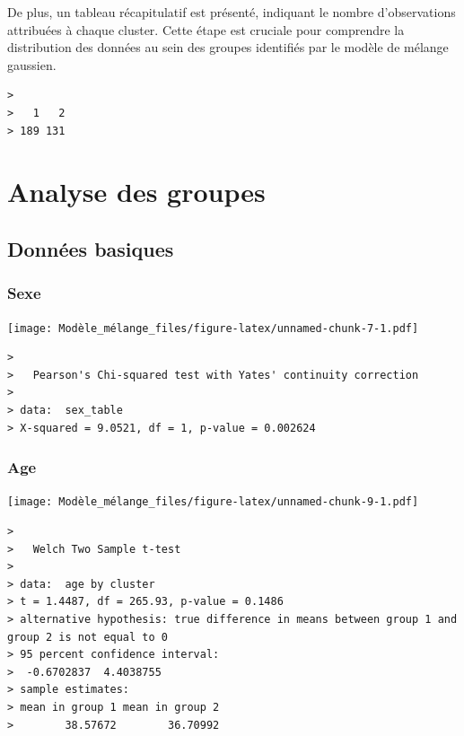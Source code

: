 \documentclass[
]{article}
\let\origfigure\figure
\let\endorigfigure\endfigure
\renewenvironment{figure}[1][2]{
    \expandafter\origfigure\expandafter[H]
} {
    \endorigfigure
}
\begin{document}
De plus, un tableau récapitulatif est présenté, indiquant le nombre
d'observations attribuées à chaque cluster. Cette étape est cruciale
pour comprendre la distribution des données au sein des groupes
identifiés par le modèle de mélange gaussien.

\begin{verbatim}
> 
>   1   2 
> 189 131
\end{verbatim}

\newpage

\hypertarget{analyse-des-groupes}{%
\section{Analyse des groupes}\label{analyse-des-groupes}}

\hypertarget{donnuxe9es-basiques}{%
\subsection{Données basiques}\label{donnuxe9es-basiques}}

\hypertarget{sexe}{%
\subsubsection{Sexe}\label{sexe}}

\begin{figure}
\centering
\texttt{[image: Modèle\_mélange\_files/figure-latex/unnamed-chunk-7-1.pdf]}
\caption{Répartition des sexes par groupe}
\end{figure}

\begin{verbatim}
> 
>   Pearson's Chi-squared test with Yates' continuity correction
> 
> data:  sex_table
> X-squared = 9.0521, df = 1, p-value = 0.002624
\end{verbatim}

\hypertarget{age}{%
\subsubsection{Age}\label{age}}

\begin{figure}
\centering
\texttt{[image: Modèle\_mélange\_files/figure-latex/unnamed-chunk-9-1.pdf]}
\caption{Distribution de l'âge par groupe}
\end{figure}

\begin{verbatim}
> 
>   Welch Two Sample t-test
> 
> data:  age by cluster
> t = 1.4487, df = 265.93, p-value = 0.1486
> alternative hypothesis: true difference in means between group 1 and group 2 is not equal to 0
> 95 percent confidence interval:
>  -0.6702837  4.4038755
> sample estimates:
> mean in group 1 mean in group 2 
>        38.57672        36.70992
\end{verbatim}
\end{document}

